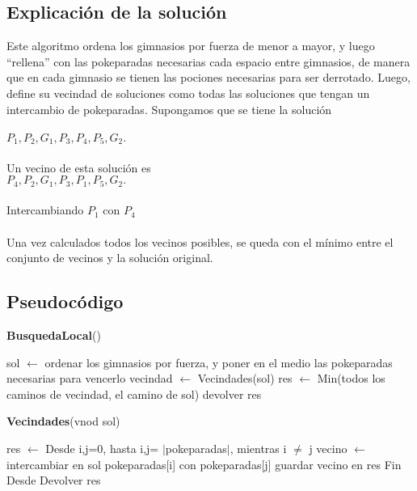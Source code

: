 \documentclass[spanish,12pt]{article}
\begin{document}
\subsection{Explicación de la solución}
Este algoritmo ordena los gimnasios por fuerza de menor a mayor, y luego ``rellena'' con las pokeparadas necesarias cada espacio entre gimnasios, de manera que en cada gimnasio se tienen las pociones necesarias para ser derrotado.
Luego, define su vecindad de soluciones como todas las soluciones que tengan un intercambio de pokeparadas. Supongamos que se tiene la solución \\
\\
 $P_{1}, P_{2} , G_{1}, P_{3}, P_{4}, P_{5}, G_{2}.$ \\
 \\
  Un vecino de esta solución es\\
  $P_{4}, P_{2} , G_{1}, P_{3}, P_{1}, P_{5}, G_{2}.$\\
  \\
  Intercambiando  $P_{1}$ con $P_{4}$\\
\\
Una vez calculados todos los vecinos posibles, se queda con el mínimo entre el conjunto de vecinos y la solución original. 
\subsection{Pseudocódigo}

\begin{algorithm}[H]{\textbf{BusquedaLocal}()}
	\begin{algorithmic}[1]
	\State sol $\gets$ ordenar los gimnasios por fuerza, y poner en el medio las pokeparadas necesarias para vencerlo
	\State vecindad $\gets$ Vecindades(sol)
	\State res $\gets$ Min(todos los caminos de vecindad, el camino de sol)
	\State devolver res
	\end{algorithmic}
\end{algorithm}

\begin{algorithm}[H]{\textbf{Vecindades}(vnod sol)}
	\begin{algorithmic}[1]
	\State res $\gets$ 
	\State Desde i,j=0, hasta i,j= $|$pokeparadas$|$, mientras i $\neq$ j
		\State \quad vecino $\gets$ intercambiar en sol pokeparadas[i] con pokeparadas[j]
		\State \quad guardar vecino en res
	\State Fin Desde
	Devolver res
	\end{algorithmic}
\end{algorithm}
\end{document}
